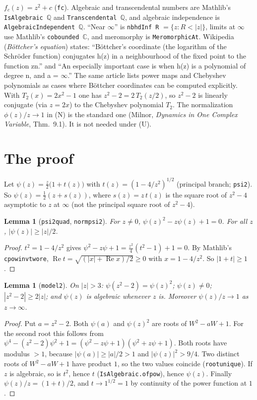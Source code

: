 \documentclass[11pt]{article}
\newtheorem{lemma}[theorem]{Lemma}
\theoremstyle{definition}
\theoremstyle{remark}
\renewcommand{\_}{\oldus\allowbreak}
\begin{document}
$f_c(z)=z^2+c$ (\texttt{fc}). Algebraic and transcendental numbers are Mathlib's
\texttt{IsAlgebraic~$\mathbb{Q}$} and \texttt{Transcendental~$\mathbb{Q}$}, and algebraic independence is
\texttt{AlgebraicIndependent~$\mathbb{Q}$}. ``Near $\infty$'' is \texttt{nbhdInf R} $=\{z: R<|z|\}$, limits
at $\infty$ use Mathlib's \texttt{cobounded~$\mathbb{C}$}, and meromorphy is \texttt{MeromorphicAt}.
Wikipedia (\emph{B\"ottcher's equation}) states:
``B\"ottcher's coordinate (the logarithm of the Schr\"oder function) conjugates h(z) in a neighbourhood
of the fixed point to the function zn.'' and ``An especially important case is when h(z) is a polynomial
of degree n, and a = $\infty$.'' The same article lists power maps and Chebyshev polynomials as cases
where B\"ottcher coordinates can be computed explicitly. With $T_2(x)=2x^2-1$ one has
$z^2-2=2\,T_2(z/2)$, so $z^2-2$ is linearly conjugate (via $z=2x$) to the Chebyshev polynomial $T_2$.
The normalization $\phi(z)/z\to1$ in (N) is the standard one (Milnor, \emph{Dynamics in One Complex
Variable}, Thm.~9.1). It is not needed under (U).

\section{The proof}

Let $\psi(z)=\frac z2\bigl(1+t(z)\bigr)$ with $t(z)=(1-4/z^2)^{1/2}$ (principal branch;
\texttt{psi2}). So $\psi(z)=\frac12(z+s(z))$, where $s(z)=z\,t(z)$ is the square root of $z^2-4$
asymptotic to $z$ at $\infty$ (not the principal square root of $z^2-4$).

\begin{lemma}[\texttt{psi2\_quad}, \texttt{norm\_psi2}]
For $z\neq0$, $\psi(z)^2-z\psi(z)+1=0$. For all $z$, $|\psi(z)|\ge|z|/2$.
\end{lemma}
\begin{proof}
$t^2=1-4/z^2$ gives $\psi^2-z\psi+1=\frac{z^2}{4}(t^2-1)+1=0$. By Mathlib's \texttt{cpow\_inv\_two\_re},
$\operatorname{Re}t=\sqrt{(|x|+\operatorname{Re}x)/2}\ge0$ with $x=1-4/z^2$. So $|1+t|\ge1$.
\end{proof}

\begin{lemma}[\texttt{model2}]
On $|z|>3$: $\psi(z^2-2)=\psi(z)^2$; $\psi(z)\ne0$; $|z^2-2|\ge2|z|$; and $\psi(z)$ is algebraic whenever
$z$ is. Moreover $\psi(z)/z\to1$ as $z\to\infty$.
\end{lemma}
\begin{proof}
Put $a=z^2-2$. Both $\psi(a)$ and $\psi(z)^2$ are roots of $W^2-aW+1$. For the second root this follows
from $\psi^4-(z^2-2)\psi^2+1=(\psi^2-z\psi+1)(\psi^2+z\psi+1)$. Both roots have modulus $>1$, because
$|\psi(a)|\ge|a|/2>1$ and $|\psi(z)|^2>9/4$. Two distinct roots of $W^2-aW+1$ have product $1$, so the
two values coincide (\texttt{root\_unique}). If $z$ is algebraic, so is $t^2$, hence $t$
(\texttt{IsAlgebraic.of\_pow}), hence $\psi(z)$. Finally $\psi(z)/z=(1+t)/2$, and $t\to1^{1/2}=1$ by
continuity of the power function at $1$.
\end{proof}
\end{document}

